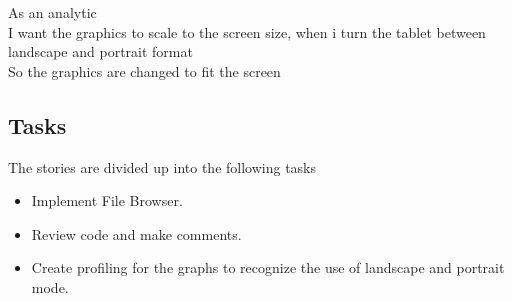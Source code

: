 As an analytic\\
I want the graphics to scale to the screen size, when i turn the tablet between landscape and portrait format\\
So the graphics are changed to fit the screen\\

\subsection{Tasks} %
\label{sub:Tasks}
The stories are divided up into the following tasks
\begin{itemize}
	\item Implement File Browser.
	\item Review code and make comments.
	\item Create profiling for the graphs to recognize the use of landscape and portrait mode.
\end{itemize}











